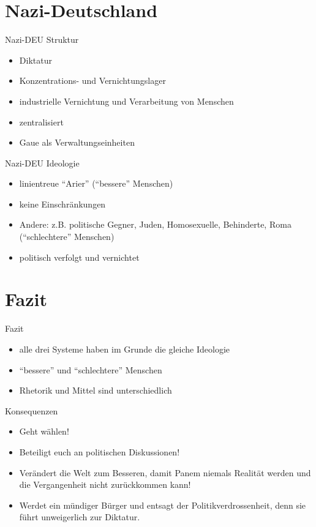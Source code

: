 \documentclass{beamer}
\begin{document}
	\section{Nazi-Deutschland}
	\begin{frame}{Nazi-DEU Struktur}
		\begin{itemize}
			\item Diktatur
			\item Konzentrations- und Vernichtungslager
			\item industrielle Vernichtung und Verarbeitung von Menschen
			\item zentralisiert
			\item Gaue als Verwaltungseinheiten
		\end{itemize}
	\end{frame}
	\begin{frame}{Nazi-DEU Ideologie}
		\begin{itemize}
			\item linientreue "`Arier"' ("`bessere"' Menschen)
			\item keine Einschränkungen
			\item Andere: z.B. politische Gegner, Juden, Homosexuelle, Behinderte, Roma ("`schlechtere"' Menschen)
			\item politisch verfolgt und vernichtet
		\end{itemize}
	\end{frame}
	
	\section{Fazit}
	\begin{frame}{Fazit}
		\begin{itemize}
			\item alle drei Systeme haben im Grunde die gleiche Ideologie
			\item "`bessere"' und "`schlechtere"' Menschen
			\item Rhetorik und Mittel sind unterschiedlich
		\end{itemize}
	\end{frame}
	\begin{frame}{Konsequenzen}
		\begin{itemize}
			\item Geht wählen!
			\item Beteiligt euch an politischen Diskussionen!
			\item Verändert die Welt zum Besseren, damit Panem niemals Realität werden und die Vergangenheit nicht zurückkommen kann!
			\item Werdet ein mündiger Bürger und entsagt der Politikverdrossenheit, denn sie führt unweigerlich zur Diktatur.
		\end{itemize}
	\end{frame}
\end{document}
